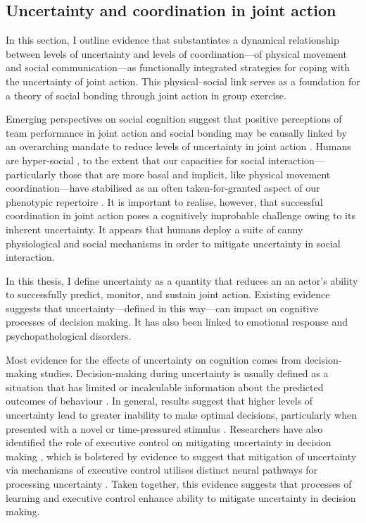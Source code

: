 \begin{CJK}{UTF8}{gbsn}



\subsection{Uncertainty and coordination in joint action}
In this section, I outline evidence that substantiates a dynamical relationship between levels of uncertainty and levels of coordination---of physical movement and social communication---as functionally integrated strategies for coping with the uncertainty of joint action.  This physical--social link serves as a foundation for a theory of social bonding through joint action in group exercise.

Emerging perspectives on social cognition suggest that positive perceptions of team performance in joint action and social bonding may be causally linked by an overarching mandate to reduce levels of uncertainty in joint action \citep{Marsh2009,Friston2015a,Pesquita2017}.  Humans are hyper-social \citep{Tomasello2012a}, to the extent that our capacities for social interaction---particularly those that are more basal and implicit, like physical movement coordination---have stabilised as an often taken-for-granted aspect of our phenotypic repertoire \citep{Wheatley2016}.  It is important to realise, however, that successful coordination in joint action poses a cognitively improbable challenge owing to its inherent uncertainty.  It appears that humans deploy a suite of canny physiological and social mechanisms in order to mitigate uncertainty in social interaction.

In this thesis, I define uncertainty as a quantity that reduces an an actor's ability to successfully predict, monitor, and sustain joint action.  Existing evidence suggests that uncertainty---defined in this way---can impact on cognitive processes of decision making. It has also been linked to emotional response and psychopathological disorders.

Most evidence for the effects of uncertainty on cognition comes from decision-making studies.  Decision-making during uncertainty is usually defined as a situation that has limited or incalculable information about the predicted outcomes of behaviour \citep{Huettel2005}.  In general, results suggest that higher levels of uncertainty lead to greater inability to make optimal decisions, particularly when presented with a novel or time-pressured stimulus \citep[versus a stimulus learned through repeated exposures;][]{Daw2005,Kording2006}.  Researchers have also identified the role of executive control on mitigating uncertainty in decision making \citep{Mushtaq2011}, which is bolstered by evidence to suggest  that mitigation of uncertainty via mechanisms of executive control  utilises distinct neural pathways for processing uncertainty \citep{Huettel2005}.  Taken together, this evidence suggests that processes of learning and executive control enhance ability to mitigate uncertainty in decision making.


\end{CJK}

